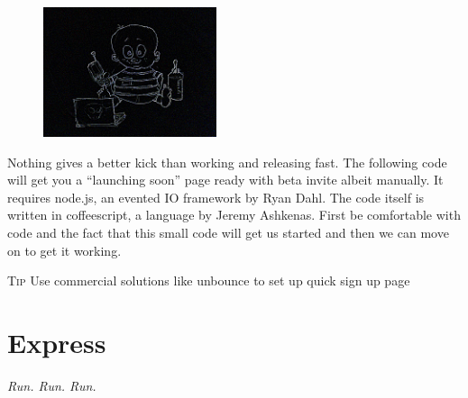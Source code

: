 \documentclass[12pt]{book}
\begin{document}
\begin{figure}
\begin{center}\includegraphics[width=2in]{org/art/getStartedHigh.png}\end{center}
\end{figure}

Nothing gives a better kick than working and releasing fast. The following code will get you a ``launching soon'' page ready with beta invite albeit manually. It requires node.js, an evented IO framework by Ryan Dahl. The code itself is written in coffeescript, a language by Jeremy Ashkenas.
First be comfortable with code and the fact that this small code will get us started and then we can move on to get it working.

\vspace{0.6cm}\vspace{0.6cm}

\colorbox{tipcolour}{\tiny \textsc{Tip} \small Use commercial solutions like unbounce to set up quick sign up page}






\chapter{Express}
\begin{flushright}\textit{Run. Run. Run.}\end{flushright}
\end{document}
